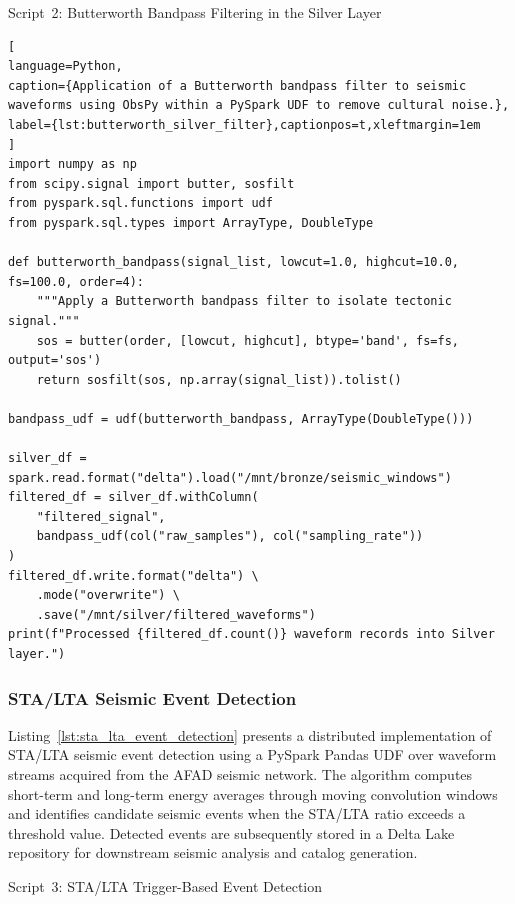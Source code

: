 \documentclass[data,article,accept,pdftex,moreauthors]{Definitions/mdpi}
\begin{document}
Script~2: Butterworth Bandpass Filtering in the Silver Layer

\begin{lstlisting}[
language=Python,
caption={Application of a Butterworth bandpass filter to seismic waveforms using ObsPy within a PySpark UDF to remove cultural noise.},
label={lst:butterworth_silver_filter},captionpos=t,xleftmargin=1em
]
import numpy as np
from scipy.signal import butter, sosfilt
from pyspark.sql.functions import udf
from pyspark.sql.types import ArrayType, DoubleType

def butterworth_bandpass(signal_list, lowcut=1.0, highcut=10.0, fs=100.0, order=4):
    """Apply a Butterworth bandpass filter to isolate tectonic signal."""
    sos = butter(order, [lowcut, highcut], btype='band', fs=fs, output='sos')
    return sosfilt(sos, np.array(signal_list)).tolist()

bandpass_udf = udf(butterworth_bandpass, ArrayType(DoubleType()))

silver_df = spark.read.format("delta").load("/mnt/bronze/seismic_windows")
filtered_df = silver_df.withColumn(
    "filtered_signal",
    bandpass_udf(col("raw_samples"), col("sampling_rate"))
)
filtered_df.write.format("delta") \
    .mode("overwrite") \
    .save("/mnt/silver/filtered_waveforms")
print(f"Processed {filtered_df.count()} waveform records into Silver layer.")
\end{lstlisting}

\subsubsection{STA/LTA Seismic Event Detection}

Listing~\ref{lst:sta_lta_event_detection} presents a distributed implementation of STA/LTA seismic event detection using a PySpark Pandas UDF over waveform streams acquired from the AFAD seismic network. The algorithm computes short-term and long-term energy averages through moving convolution windows and identifies candidate seismic events when the STA/LTA ratio exceeds a threshold value. Detected events are subsequently stored in a Delta Lake repository for downstream seismic analysis and catalog generation.

Script~3: STA/LTA Trigger-Based Event Detection
\end{document}
